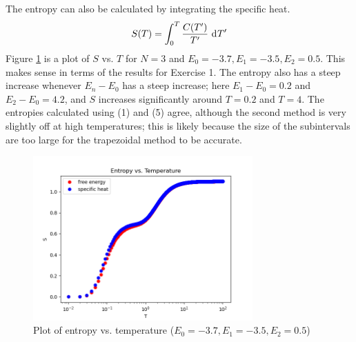 \documentclass{article}
\begin{document}
\problem
The entropy can also be calculated by integrating the specific heat.
\begin{equation}
    S(T) = \int_0^T \frac{C(T')}{T'} \, \diff{T'}
\end{equation}
Figure \ref{fig:fig3} is a plot of $S$ vs. $T$ for $N = 3$ and $E_0 = -3.7, E_1 = -3.5, E_2 = 0.5$. This makes sense in terms of the results for Exercise 1. The entropy also has a steep increase whenever $E_n - E_0$ has a steep increase; here $E_1 - E_0 = 0.2$ and $E_2 - E_0 = 4.2$, and $S$ increases significantly around $T = 0.2$ and $T = 4$. The entropies calculated using (1) and (5) agree, although the second method is very slightly off at high temperatures; this is likely because the size of the subintervals are too large for the trapezoidal method to be accurate.
\begin{figure}[!htb]
    \centering
    \includegraphics[width=0.75\textwidth]{../code/phy112l_lab2/2-6.png}
    \caption{Plot of entropy vs. temperature ($E_0 = -3.7, E_1 = -3.5, E_2 = 0.5$)}
    \label{fig:fig3}
\end{figure}
\end{document}
